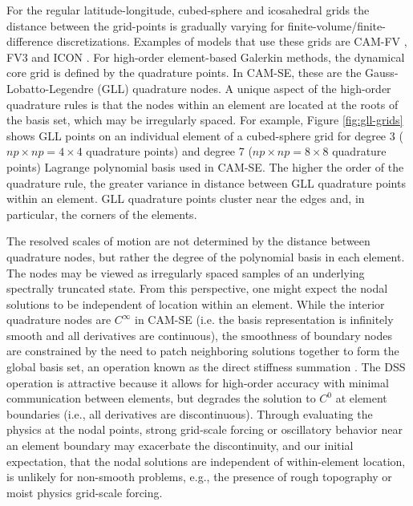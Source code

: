 \documentclass{ametsoc}
\begin{document}
For the regular latitude-longitude, cubed-sphere and icosahedral grids the distance between the grid-points is gradually varying for finite-volume/finite-difference discretizations. Examples of models that use these grids are CAM-FV \citep[latitude-longitude grid, ][]{L2004MWR}, FV3 \citep[cubed-sphere grid, ][]{PL2007JCP} and ICON \citep[icosahedral grid, ][]{WETAL2013GMD}. For high-order element-based Galerkin methods, the dynamical core grid is defined by the quadrature points. In CAM-SE, these are the Gauss-Lobatto-Legendre (GLL) quadrature nodes. A unique aspect of the high-order quadrature rules is that the nodes within an element are located at the roots of the basis set, which may be irregularly spaced. For example, Figure \ref{fig:gll-grids} shows GLL points on an individual element of a cubed-sphere grid for degree 3 ($np\times np=4\times 4$ quadrature points) and degree 7 ($np\times np=8\times 8$ quadrature points) Lagrange polynomial basis used in CAM-SE. The higher the order of the quadrature rule, the greater variance in distance between GLL quadrature points within an element. GLL quadrature points cluster near the edges and, in particular, the corners of the elements.

The resolved scales of motion are not determined by the distance between quadrature nodes, but rather the degree of the polynomial basis in each element. The nodes may be viewed as irregularly spaced samples of an underlying spectrally truncated state. From this perspective, one might expect the nodal solutions to be independent of location within an element. While the interior quadrature nodes are $C^{\infty}$ in CAM-SE (i.e. the basis representation is infinitely smooth and all derivatives are continuous), the smoothness of boundary nodes are constrained by the need to patch neighboring solutions together to form the global basis set, an operation known as the direct stiffness summation \citep[DSS; ][]{MadayPatera87,canuto2007}. The DSS operation is attractive because it allows for high-order accuracy with minimal communication between elements, but degrades the solution to $C^0$ at element boundaries (i.e., all derivatives are discontinuous). Through evaluating the physics at the nodal points, strong grid-scale forcing or oscillatory behavior near an element boundary may exacerbate the discontinuity, and our initial expectation, that the nodal solutions are independent of within-element location, is unlikely for non-smooth problems, e.g., the presence of rough topography or moist physics grid-scale forcing.
\end{document}
